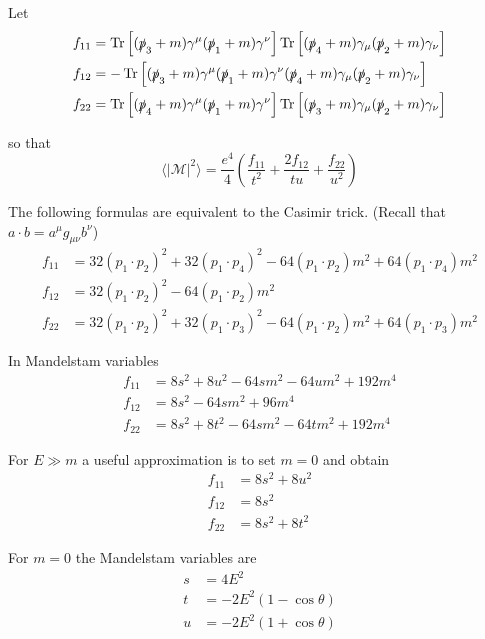 Let
\begin{align*}
f_{11}&=
\operatorname{Tr}\left[
(\slashed p_3+m)\gamma^\mu(\slashed p_1+m)\gamma^\nu
\right]
\operatorname{Tr}\left[
(\slashed p_4+m)\gamma_\mu(\slashed p_2+m)\gamma_\nu
\right]
\\
f_{12}&=
-\operatorname{Tr}\left[
(\slashed p_3+m)\gamma^\mu(\slashed p_1+m)\gamma^\nu
(\slashed p_4+m)\gamma_\mu(\slashed p_2+m)\gamma_\nu
\right]
\\
f_{22}&=
\operatorname{Tr}\left[
(\slashed p_4+m)\gamma^\mu(\slashed p_1+m)\gamma^\nu
\right]
\operatorname{Tr}\left[
(\slashed p_3+m)\gamma_\mu(\slashed p_2+m)\gamma_\nu
\right]
\end{align*}

so that
\begin{equation*}
\langle|\mathcal{M}|^2\rangle
=\frac{e^4}{4}
\left(
\frac{f_{11}}{t^2}+\frac{2f_{12}}{tu}+\frac{f_{22}}{u^2}
\right)
\end{equation*}

The following formulas are equivalent to the Casimir trick.
(Recall that $a\cdot b=a^\mu g_{\mu\nu}b^\nu$)
\begin{align*}
f_{11}&=32 (p_1\cdot p_2)^2 + 32 (p_1\cdot p_4)^2 - 64 (p_1\cdot p_2) m^2 + 64 (p_1\cdot p_4) m^2
\\
f_{12}&=32 (p_1\cdot p_2)^2 - 64 (p_1\cdot p_2) m^2
\\
f_{22}&=32 (p_1\cdot p_2)^2 + 32 (p_1\cdot p_3)^2 - 64 (p_1\cdot p_2) m^2 + 64 (p_1\cdot p_3) m^2
\end{align*}

In Mandelstam variables
\begin{align*}
f_{11} &= 8 s^2 + 8 u^2 - 64 s m^2 - 64 u m^2 + 192 m^4
\\
f_{12} &= 8 s^2 - 64 s m^2 + 96 m^4
\\
f_{22} &= 8 s^2 + 8 t^2 - 64 s m^2 - 64 t m^2 + 192 m^4
\end{align*}

For $E\gg m$ a useful approximation is to set $m=0$ and obtain
\begin{align*}
f_{11}&=8s^2+8u^2\\
f_{12}&=8s^2\\
f_{22}&=8s^2+8t^2
\end{align*}

For $m=0$ the Mandelstam variables are
\begin{align*}
s&=4E^2
\\
t&=-2E^2(1-\cos\theta)
\\
u&=-2E^2(1+\cos\theta)
\end{align*}

